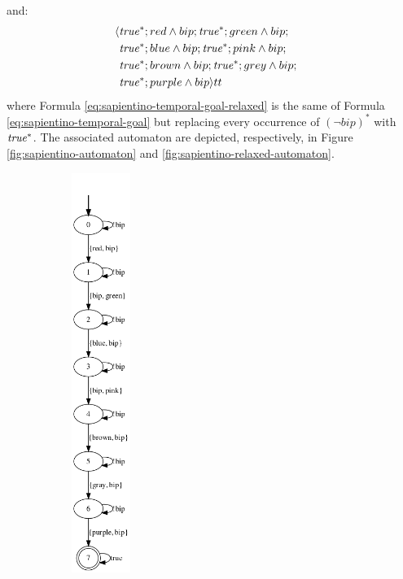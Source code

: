 and: 
\begin{align}\label{eq:sapientino-temporal-goal-relaxed}
\langle &\mathit{true}^*;red \wedge bip;\mathit{true}^*;green \wedge bip;& \nonumber\\
	&\mathit{true}^*;blue \wedge bip;\mathit{true}^*;pink \wedge bip;& \nonumber\\
	&\mathit{true}^*;brown \wedge bip;\mathit{true}^*;grey \wedge bip;&\nonumber\\
	&\mathit{true}^*;purple \wedge bip \rangle tt
\end{align}
where Formula \ref{eq:sapientino-temporal-goal-relaxed} is the same of Formula \ref{eq:sapientino-temporal-goal} but replacing every occurrence of  $(\lnot bip)^*$ with $\mathit{true}^*$. The associated automaton are depicted, respectively, in Figure \ref{fig:sapientino-automaton} and \ref{fig:sapientino-relaxed-automaton}.
\begin{figure}[h]
	\begin{subfigure}{0.5\textwidth}
		\centering
		\includegraphics[width=0.21\textwidth]{images/sapientino_ldlf.png}

\end{subfigure}
\end{figure}

